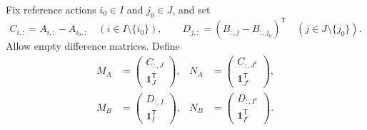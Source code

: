 \documentclass[11pt]{article}
\newcommand{\one}{\mathbf 1}
\theoremstyle{definition}
\theoremstyle{remark}
\begin{document}
Fix reference actions $i_0\in I$ and $j_0\in J$, and set
\[
 C_{i,:}=A_{i,:}-A_{i_0,:}\quad(i\in I\setminus\{i_0\}),\qquad
 D_{j,:}=(B_{:,j}-B_{:,j_0})^{\mathsf T}\quad(j\in J\setminus\{j_0\}).
\]
Allow empty difference matrices. Define
\begin{equation}\label{eq:matrices}
 \begin{aligned}
 M_A&=\begin{pmatrix}C_{:,J}\\\one_J^{\mathsf T}\end{pmatrix},&
 N_A&=\begin{pmatrix}C_{:,J^c}\\\one_{J^c}^{\mathsf T}\end{pmatrix},\\
 M_B&=\begin{pmatrix}D_{:,I}\\\one_I^{\mathsf T}\end{pmatrix},&
 N_B&=\begin{pmatrix}D_{:,I^c}\\\one_{I^c}^{\mathsf T}\end{pmatrix}.
 \end{aligned}
\end{equation}
\end{document}
